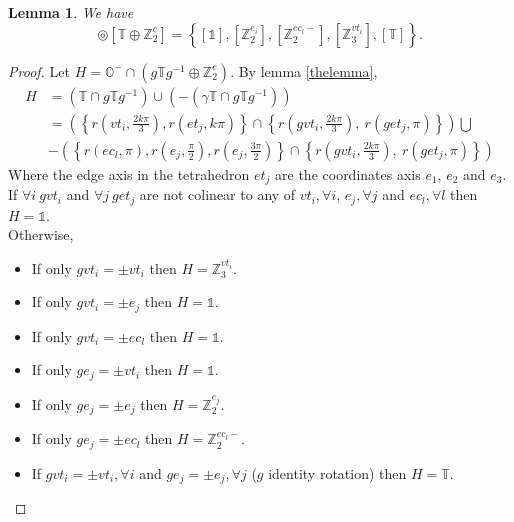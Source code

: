 \documentclass[11pt,a4paper]{amsart}
\newtheorem{lem}[thm]{Lemma}
\theoremstyle{definition}
\newcommand{\ZZ}{\mathbb{Z}}                %
\newcommand{\octa}{\mathbb{O}}              %
\newcommand{\tetra}{\mathbb{T}}             %
\newcommand{\1}{\mathds{1}}		            %
\newcommand{\set}[1]{\left\{#1\right\}}     %
\begin{document}
\begin{lem}
We have
\begin{equation*}
[\octa^-] \circledcirc [\tetra \oplus \ZZ_2^c]=\set{[\1],[\ZZ_2^{e_i}],[\ZZ_2^{ec_l-}],[\ZZ_3^{vt_i}],[\tetra]}.
\end{equation*}
\end{lem}
\begin{proof}
Let $H=\octa^- \cap (g\tetra g^{-1} \oplus \ZZ_2^c)$.
By lemma \ref{thelemma},
\begin{align*}
H&=(\tetra\cap g \tetra g^{-1})\cup (-(\gamma\tetra\cap g \tetra g^{-1}))\\
&=\left(\set{r(vt_i,\frac{2k\pi}{3}),r(et_j,k\pi)}\cap \set{r(gvt_i,\frac{2k\pi}{3}),\ r(get_j,\pi)}\right)\bigcup\\
&-\left(\set{r(ec_l,\pi),r(e_j,\frac{\pi}{2}),r(e_j,\frac{3\pi}{2})}\cap \set{r(gvt_i,\frac{2k\pi}{3}),\ r(get_j,\pi)}\right)
\end{align*}
Where the edge axis in the tetrahedron $et_j$ are the coordinates axis $e_1$, $e_2$ and $e_3$.\\
If $\forall i\ gvt_i$ and $\forall j\ get_j$ are not colinear to any of $vt_i,\forall i$, $e_j,\forall j$ and $ec_l,\forall l$  then $H=\1$.\\
Otherwise,
\begin{itemize}
\item If only $gvt_i=\pm vt_i$ then $H=\ZZ_3^{vt_i}$.
\item If only $gvt_i=\pm e_j$ then $H=\1$.
\item If only $gvt_i=\pm ec_l$ then $H=\1$.
\item If only $ge_j=\pm vt_i$ then $H=\1$.
\item If only $ge_j=\pm e_j$ then $H=\ZZ_2^{e_j}$.
\item If only $ge_j=\pm ec_l$ then $H=\ZZ_2^{ec_l-}.$
\item If $gvt_i=\pm vt_i, \forall i$ and $ge_j=\pm e_j, \forall j$ ($g$ identity rotation) then $H=\tetra$.
\end{itemize}
\end{proof}
\end{document}
